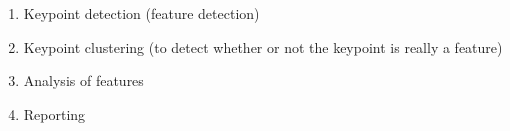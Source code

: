 \documentclass{article}
\begin{document}
\begin{enumerate}
\begin{enumerate}
\begin{enumerate}
	    	\item Keypoint detection (feature detection)
	    	\item Keypoint clustering (to detect whether or not the keypoint is really
	    	a feature)
	    	\item Analysis of features
	    	\item Reporting
		\end{enumerate}
	\end{enumerate}
\end{enumerate}
\pagebreak

\label{Programming Problem (Seam Carving)}
\end{document}
